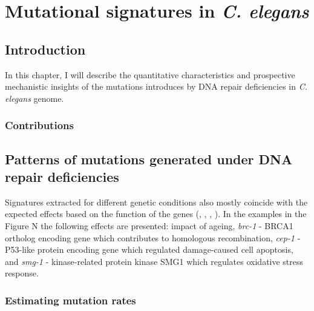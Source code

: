 

\pagestyle{empty}
\chapter{Mutational signatures in \textit{C. elegans}}

\section{Introduction}


In this chapter, I will describe the quantitative characteristics and
prospective mechanistic insights of the mutations introduces by DNA 
repair deficiencies in \textit{C. elegans} genome.


\subsection*{Contributions}



\section{Patterns of mutations generated under DNA repair deficiencies}

Signatures extracted for different genetic conditions also mostly coincide with 
the expected effects based on the function of the genes (\cite{p53}, \cite{Meier1},
\cite{DNArepair}, \cite{DNAdamagerepair}). In the examples in the Figure N the 
following effects are presented: impact of ageing, \textit{brc-1} - BRCA1 ortholog 
encoding gene which contributes to homologous recombination, \textit{cep-1} - 
P53-like protein encoding gene which regulated damage-caused cell apoptosis, 
and \textit{smg-1} - kinase-related protein kinase SMG1 which regulates oxidative stress response.

\subsection{Estimating mutation rates}

